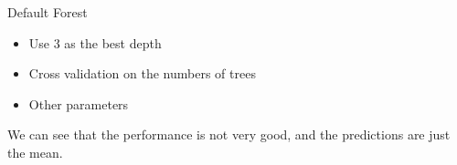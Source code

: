 \documentclass{beamer}
\begin{document}
\begin{frame}{Default Forest}
\begin{itemize}
    \item Use 3 as the best depth
    \item Cross validation on the numbers of trees
    \item Other parameters
\end{itemize}

\begin{figure}[htbp]


\end{figure}
We can see that the performance is not very good, and the predictions are just the mean.
\end{frame}
\end{document}
